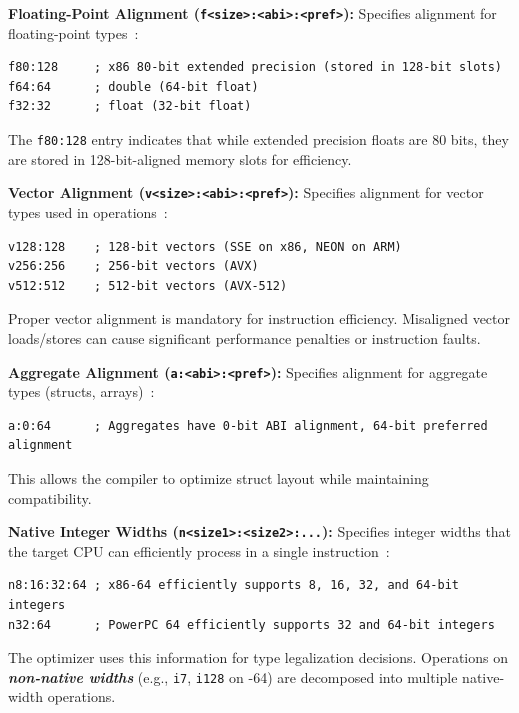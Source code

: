 \textbf{Floating-Point Alignment (\texttt{f<size>:<abi>:<pref>}):} Specifies alignment for floating-point types~\cite{llvmlangref}:

\begin{lstlisting}[style=ir]
f80:128     ; x86 80-bit extended precision (stored in 128-bit slots)
f64:64      ; double (64-bit float)
f32:32      ; float (32-bit float)
\end{lstlisting}

The \texttt{f80:128} entry indicates that while  extended precision floats are 80 bits, they are stored in 128-bit-aligned memory slots for efficiency.

\textbf{Vector Alignment (\texttt{v<size>:<abi>:<pref>}):} Specifies alignment for vector types used in  operations~\cite{llvmlangref}:

\begin{lstlisting}[style=ir]
v128:128    ; 128-bit vectors (SSE on x86, NEON on ARM)
v256:256    ; 256-bit vectors (AVX)
v512:512    ; 512-bit vectors (AVX-512)
\end{lstlisting}

Proper vector alignment is mandatory for  instruction efficiency. Misaligned vector loads/stores can cause significant performance penalties or instruction faults.

\textbf{Aggregate Alignment (\texttt{a:<abi>:<pref>}):} Specifies alignment for aggregate types (structs, arrays)~\cite{llvmlangref}:

\begin{lstlisting}[style=ir]
a:0:64      ; Aggregates have 0-bit ABI alignment, 64-bit preferred alignment
\end{lstlisting}

This allows the compiler to optimize struct layout while maintaining  compatibility.

\textbf{Native Integer Widths (\texttt{n<size1>:<size2>:...}):} Specifies integer widths that the target CPU can efficiently process in a single instruction~\cite{llvmlangref}:

\begin{lstlisting}[style=ir]
n8:16:32:64 ; x86-64 efficiently supports 8, 16, 32, and 64-bit integers
n32:64      ; PowerPC 64 efficiently supports 32 and 64-bit integers
\end{lstlisting}

The optimizer uses this information for type legalization decisions. Operations on \textbf{\textit{non-native widths}} (e.g., \texttt{i7}, \texttt{i128} on -64) are decomposed into multiple native-width operations.


